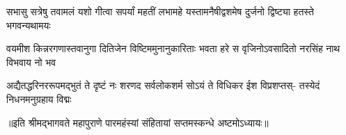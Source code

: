 

\fourlineindentedshloka
{सभासु सत्रेषु तवामलं यशो}
{गीत्वा सपर्यां महतीं लभामहे}
{यस्तामनैषीद्वशमेष दुर्जनो}
{द्विष्ट्या हतस्ते भगवन्यथामयः} %



\fourlineindentedshloka
{वयमीश किन्नरगणास्तवानुगा}
{दितिजेन विष्टिममुनानुकारिताः}
{भवता हरे स वृजिनोऽवसादितो}
{नरसिंह नाथ विभवाय नो भव} %


\fourlineindentedshloka
{अद्यैतद्धरिनररूपमद्भुतं ते}
{दृष्टं नः शरणद सर्वलोकशर्म}
{सोऽयं ते विधिकर ईश विप्रशप्तस्-}
{तस्येदं निधनमनुग्रहाय विद्मः} %


॥इति श्रीमद्भागवते महापुराणे पारमहंस्यां संहितायां सप्तमस्कन्धे अष्टमोऽध्यायः॥

